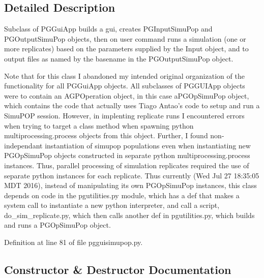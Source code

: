 \subsection{Detailed Description}
\begin{DoxyVerb}Subclass of PGGuiApp builds a gui,
creates PGInputSimuPop and PGOutputSimuPop
objects, then on user command runs a simulation 
(one or more replicates) based on the parameters 
supplied by the Input object, and to output files 
as named by the basename in the PGOutputSimuPop object.  

Note that for this class I abandoned my intended original 
organization of the functionality for all  PGGuiApp objects.
All subclasses of PGGUIApp objects were to contain an 
AGPOperation object, in this case aPGOpSimuPop object, 
which contains the code that actually uses Tiago Antao's 
code to setup and run a SimuPOP session.  However, in 
implenting replicate runs I encountered errors when
trying to target a class method when spawning python
multiprocessing.process objects from this object.  Further,
I found non-independant instantiation of simupop populations 
even when instantiating new PGOpSimuPop objects constructed
in separate python multiprocessing.process instances.   
Thus, parallel processing of simulation replicates required 
the use of separate python instances for each replicate. 
Thus currently (Wed Jul 27 18:35:05 MDT 2016),
instead of manipulating its own PGOpSimuPop instances,
this class depends on code in the pgutilities.py
module, which has a def that makes a system call to 
instantiate a new python interpreter, and call a script,
do_sim_replicate.py, which then calls another def in 
pgutilities.py, which builds and runs a PGOpSimuPop object.\end{DoxyVerb}
 

Definition at line 81 of file pgguisimupop.\+py.



\subsection{Constructor \& Destructor Documentation}
